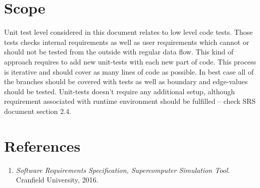 \section{Scope} \label{s:introduction:scope}
	\begin{comment}
		Identify the test items (software or system) that are the object of testing, e.g., specific attributes of the
		software, the installation instructions, the user instructions, interfacing hardware, database conversion
		software that is not a part of the operational system) including their version/revision level. Also
		identify any procedures for their transfer from other environments to the test environment.
		Supply references to the test item documentation relevant to an individual level of test, if it exists, such
		as follows:
		⎯ Requirements
		⎯ Design
		⎯ User’s guide
		⎯ Operations guide
		⎯ Installation guide
		Reference any Anomaly Reports relating to the test items.
		Identify any items that are to be specifically excluded from testing.
	\end{comment}
	Unit test level considered in this document relates to low level code tests. Those tests checks internal requirements as well as user requirements which cannot or should not be tested from the outside with regular data flow. This kind of approach requires to add new unit-tests with each new part of code. This process is iterative and should cover as many lines of code as possible. In best case all of the branches should be covered with tests as well as boundary and edge-values should be tested. Unit-tests doesn't require any additional setup, although requirement associated with runtime environment should be fulfilled -- check \gls{SRS} document section 2.4. 
\section{References} \label{s:introduction:references}
	\begin{comment}
		List all of the applicable reference documents. The references are separated into “external” references
		that are imposed external to the project and “internal” references that are imposed from within to the
		project. This may also be at the end of the document.
	\end{comment}
	\begin{enumerate}
		\item \emph{Software Requirements Specification, Supercomputer Simulation Tool}. Cranfield University, 2016. 
	\end{enumerate}